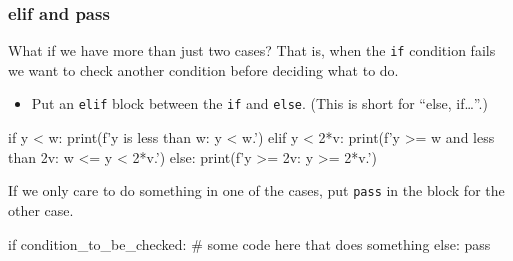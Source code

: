 \documentclass{beamer}
\newenvironment{codeblock}
    {\hfill\begin{beamerboxesrounded}[lower=codecol, width=0.8\textwidth]
    \medskip

    }
    { 
    \end{beamerboxesrounded}\hfill
    }
\theoremstyle{example}
\newcommand{\ttt}[1]{{\small\texttt{#1}}}
\begin{document}
\begin{frame}[fragile]
\frametitle{{\ttm elif} and {\ttm pass}}

What if we have more than just two cases? That is, when the \ttt{if} condition fails we want to check another condition before deciding what to do.

\begin{itemize}
	\item[] Put an \ttt{elif} block between the \ttt{if} and \ttt{else}. (This is short for ``else, if\ldots''.)
\end{itemize}

\begin{codeblock}

\begin{python}
if y < w:
    print(f'y is less than w: {y} < {w}.')
elif y < 2*v:
    print(f'y >= w and less than 2v: {w} <= {y} < {2*v}.')
else:
    print(f'y >= 2v: {y} >= {2*v}.')
\end{python}

\end{codeblock}

\vfill
If we only care to do something in one of the cases, put \ttt{pass} in the block for the other case.

\begin{codeblock}

\begin{python}
if condition_to_be_checked:
    # some code here that does something
else:
    pass
\end{python}

\end{codeblock}
\end{frame}
\end{document}

